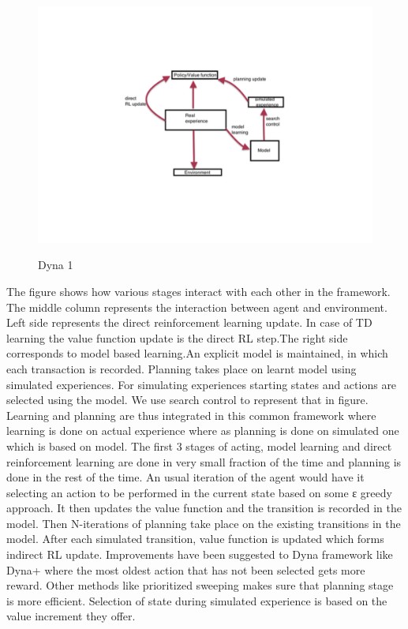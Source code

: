 \documentclass[MTech]{iitmdiss}
\begin{document}
\begin{figure}[htpb]
   \begin{center}
     \resizebox{170mm}{150mm} {\includegraphics {dyna2}}
     \caption {Dyna 1 }
   \label{fig:dyna-1}
   \end{center}
 \end{figure}
The figure shows how various stages interact with each other in the framework. The middle column represents the interaction between agent and environment. Left side represents the direct reinforcement learning update. In case of TD learning the value function update is the direct RL step.The right side corresponds to model based learning.An explicit model is maintained, in which each transaction is recorded. Planning takes place on learnt model using simulated experiences. For simulating experiences starting states and actions are selected using the model. We use search control to represent that in figure. Learning and planning are thus integrated in this common framework where learning is done on actual experience where as planning is done on simulated one which is based on model. The first 3 stages of acting, model learning and direct reinforcement learning are done in very small fraction of the time and planning is done in the rest of the time. An usual iteration of the agent would have it selecting an action to be performed in the current state based on some ε greedy approach. It then updates the value function and the transition is recorded in the model. Then N-iterations of planning take place on the existing transitions in the model. After each simulated transition, value function is updated which forms indirect RL update.
Improvements have been suggested to Dyna framework like Dyna+ where the most oldest action that has not been selected gets more reward. Other methods like prioritized sweeping makes sure that planning stage is more efficient. Selection of state during simulated experience is based on the value increment they offer.
\end{document}

